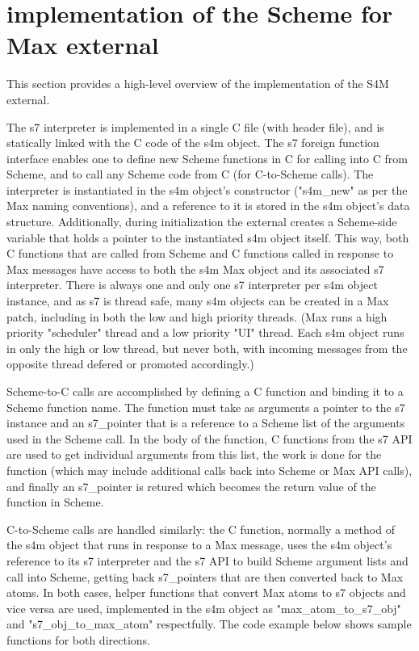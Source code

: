 \documentclass[acmsmall]{acmart}
\begin{document}
\section{implementation of the Scheme for Max external}

This section provides a high-level overview of the implementation of the S4M external.

The s7 interpreter is implemented in a single C file (with header file), 
and is statically linked with the C code of the s4m object. 
The s7 foreign function interface enables one to define new Scheme functions in C 
for calling into C from Scheme, and to call any Scheme code from C (for C-to-Scheme calls). 
The interpreter is instantiated
in the s4m object's constructor ("s4m\_new" as per the Max naming conventions), and
a reference to it is stored in the s4m object's data structure.
Additionally, during initialization the external creates a Scheme-side variable 
that holds a pointer to the instantiated s4m object itself. This way,
both C functions that are called from Scheme and C functions called in response to Max
messages have access to both the s4m Max object and its associated s7 interpreter.
There is always one and only one s7 interpreter per s4m object instance, and
as s7 is thread safe, many s4m objects can be created in a Max patch, including
in both the low and high priority threads. (Max runs a high priority "scheduler" 
thread and a low priority "UI" thread. Each s4m object runs in only
the high or low thread, but never both, with incoming messages from the opposite
thread defered or promoted accordingly.)

Scheme-to-C calls are accomplished by defining a C function and binding
it to a Scheme function name. The function must take as arguments
a pointer to the s7 instance and an s7\_pointer
that is a reference to a Scheme list of the arguments used in the Scheme call.
In the body of the function, C functions from the s7 API are used to get 
individual arguments from this list, the work is done for the function 
(which may include additional calls back into Scheme or Max API calls),
and finally an s7\_pointer is retured which becomes the return value of the 
function in Scheme.

C-to-Scheme calls are handled similarly: the C function, normally a method
of the s4m object that runs in response to a Max message, uses the
s4m object's reference to its s7 interpreter and the s7 API to build
Scheme argument lists and call into Scheme, getting back s7\_pointers that
are then converted back to Max atoms. In both cases, helper
functions that convert Max atoms to s7 objects and vice versa are used, 
implemented in the s4m object as "max\_atom\_to\_s7\_obj" and "s7\_obj\_to\_max\_atom"
respectfully. The code example below shows sample functions for both directions.
\end{document}
